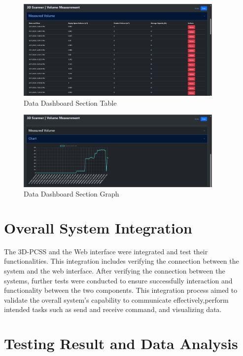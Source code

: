 \begin{figure}[H]
	\centering
	\includegraphics[width=0.9\textwidth]{Figures/main-dashboard-1}
	\caption{Data Dashboard Section Table}
	\label{ch4:fig:main-dashboard-1}
\end{figure}

\begin{figure}[H]
	\centering
	\includegraphics[width=0.9\textwidth]{Figures/main-dashboard-2}
	\caption{Data Dashboard Section Graph}
	\label{ch4:fig:main-dashboard-2}
\end{figure}

\section{Overall System Integration}
The 3D-PCSS and the Web interface were integrated and test their functionalities. This integration includes verifying the connection between the system and the web interface. After verifying the connection between the systems, further tests were conducted to ensure successfully interaction and functionality between the two components. This integration process aimed to validate the overall system's capability to communicate effectively,perform intended tasks such as send and receive command, and visualizing data.


\section{Testing Result and Data Analysis}

